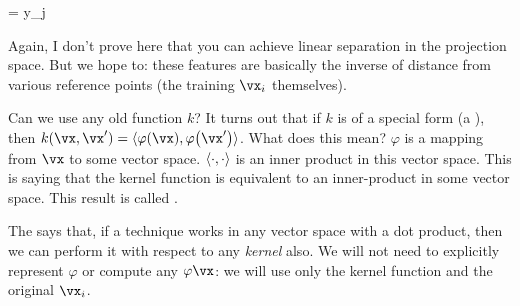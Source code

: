 \documentclass[11pt, oneside]{amsart}
\begin{document}
\begin{nedqn}
   = y_j
\end{nedqn}

Again, I don't prove here that you can achieve linear separation in the
projection space. But we hope to: these features are basically the
inverse of distance from various reference points (the training $\vx_i$
themselves).

Can we use any old function $k$? It turns out that if $k$ is of a
special form (a ), then $k(\vx, \vx') =
\iprod{\vphif{\vx}}{\vphif{\vx'}}$. What does this mean? $\varphi$ is a
mapping from $\vx$ to some vector space. $\langle \cdot, \cdot \rangle$ is an
inner product in this vector space. This is saying that the kernel
function is equivalent to an inner-product in some vector space. This
result is called .

The  says that, if a technique works in any vector
space with a dot product, then we can perform it with respect to any
\emph{kernel} also. We will not need to explicitly represent $\varphi$
or compute any $\varphi{\vx}$: we will use only the kernel function and
the original $\vx_i$.
\end{document}
